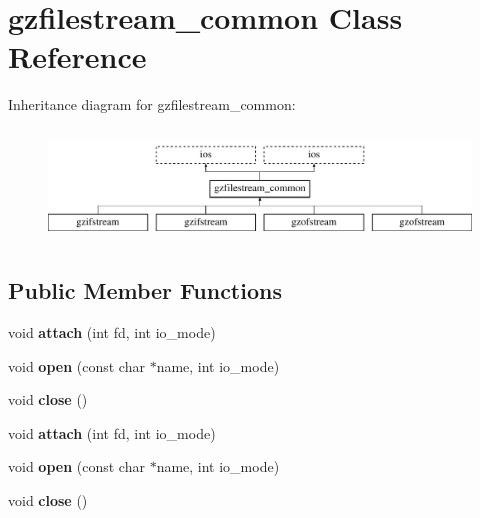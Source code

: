 \hypertarget{classgzfilestream__common}{}\section{gzfilestream\+\_\+common Class Reference}
\label{classgzfilestream__common}
Inheritance diagram for gzfilestream\+\_\+common\+:\begin{figure}[H]
\begin{center}
\leavevmode
\includegraphics[height=3.000000cm]{classgzfilestream__common}
\end{center}
\end{figure}
\subsection*{Public Member Functions}
\begin{DoxyCompactItemize}
\item 
\mbox{\label{classgzfilestream__common_a5d89983a0a4842ac15dddc7927031d7e}} 
void {\bfseries attach} (int fd, int io\+\_\+mode)
\item 
\mbox{\label{classgzfilestream__common_a642732c6ddbdc437ea996acecf7d419b}} 
void {\bfseries open} (const char $\ast$name, int io\+\_\+mode)
\item 
\mbox{\label{classgzfilestream__common_a87aa2bfaf8876e1d63edafb7515aaf5f}} 
void {\bfseries close} ()
\item 
\mbox{\label{classgzfilestream__common_a5d89983a0a4842ac15dddc7927031d7e}} 
void {\bfseries attach} (int fd, int io\+\_\+mode)
\item 
\mbox{\label{classgzfilestream__common_a642732c6ddbdc437ea996acecf7d419b}} 
void {\bfseries open} (const char $\ast$name, int io\+\_\+mode)
\item 
\mbox{\label{classgzfilestream__common_a87aa2bfaf8876e1d63edafb7515aaf5f}} 
void {\bfseries close} ()
\end{DoxyCompactItemize}
